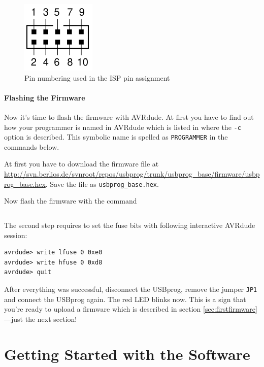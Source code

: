 \documentclass[bibtotoc,UKenglish,halfparskip,oneside,DIV12]{scrreprt}
\begin{document}
\begin{figure}[tb]
  \centering
  \includegraphics{images/isp}
  \caption{Pin numbering used in the ISP pin assignment}
  \label{fig:isp}
\end{figure}

\subsubsection{Flashing the Firmware}

Now it's time to flash the firmware with AVRdude. At first you have to find out how your programmer
is named in AVRdude which is listed in \cite{AVRdude} where the \texttt{-c} option is described.
This symbolic name is spelled as \texttt{PROGRAMMER} in the commands below.

At first you have to download the firmware file at
\url{http://svn.berlios.de/svnroot/repos/usbprog/trunk/usbprog\_base/firmware/usbprog\_base.hex}.
Save the file as \texttt{usbprog\_base.hex}.

Now flash the firmware with the command

\begin{lstlisting}[style=inline]
% avrdude -p m32 -c PROGRAMMER -U flash:w:usbprog_base.hex
\end{lstlisting}

The second step requires to set the fuse bits with following interactive AVRdude session:

\begin{lstlisting}[style=inline]
% avrdude -p m32 -c PROGRAMMER -t
avrdude> write lfuse 0 0xe0
avrdude> write hfuse 0 0xd8
avrdude> quit
\end{lstlisting}

After everything was successful, disconnect the USBprog, remove the jumper \texttt{JP1} and connect
the USBprog again. The red LED blinks now. This is a sign that you're ready to upload a firmware
which is described in section \vref{sec:firstfirmware}---just the next section!


\chapter{Getting Started with the Software}
\end{document}
